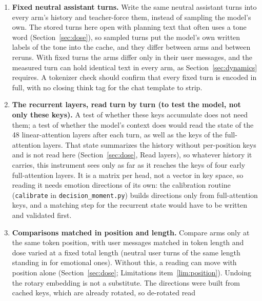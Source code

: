 \documentclass[11pt,a4paper]{article}
\begin{document}
\begin{enumerate}[nosep]
    \item \textbf{Fixed neutral assistant turns.} Write the same neutral
          assistant turns into every arm's history and teacher-force
          them, instead of sampling the model's own. The stored turns
          here open with planning text that often uses a tone word
          (Section~\ref{sec:dose}), so sampled turns put the model's own
          written labels of the tone into the cache, and they differ
          between arms and between reruns. With fixed turns the arms
          differ only in their user messages, and the measured turn can
          hold identical text in every arm, as
          Section~\ref{sec:dynamics} requires. A tokenizer check should
          confirm that every fixed turn is encoded in full, with no
          closing think tag for the chat template to strip.
    \item \textbf{The recurrent layers, read turn by turn (to test the
          model, not only these keys).} A test of whether these keys
          accumulate does not need them; a test of whether the model's
          context does would read the state of the 48 linear-attention
          layers after each turn, as well as the keys of the
          full-attention layers. That state summarizes the history
          without per-position keys and is not read here
          (Section~\ref{sec:dose}, Read layers), so whatever history it
          carries, this instrument sees only as far as it reaches the
          keys of four early full-attention layers. It is a matrix per
          head, not a vector in key space, so reading it needs emotion
          directions of its own: the calibration routine
          (\texttt{calibrate} in \texttt{decision\_moment.py}) builds
          directions only from full-attention keys, and a matching step
          for the recurrent state would have to be written and validated
          first.
    \item \textbf{Comparisons matched in position and length.} Compare
          arms only at the same token position, with user messages
          matched in token length and dose varied at a fixed total length
          (neutral user turns of the same length standing in for
          emotional ones). Without this, a reading can move with position
          alone (Section~\ref{sec:dose}; Limitations item~\ref{lim:position}). Undoing the
          rotary embedding is not a substitute. The directions were built
          from cached keys, which are already rotated, so de-rotated read

\end{enumerate}
\end{document}
